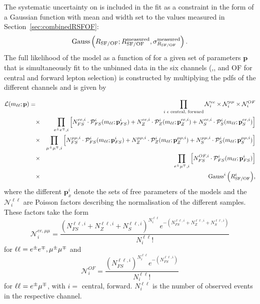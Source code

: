 The systematic uncertainty on \Rsfof is included in the fit as a constraint in the form of a Gaussian function with mean and width set to the values measured in Section~\ref{sec:combinedRSFOF}:
\begin{equation*}
\mathrm{Gauss}\left(R_{\text{SF/OF}};R_{\text{SF/OF}}^{\text{measured}},\sigma_{R_{\text{SF/OF}}}^{\text{measured}}\right).
\end{equation*}
The full likelihood of the model as a function of \mll for a given set of parameters $\mathbf{p}$ that is simultaneously fit to the unbinned data in the six channels (\EE,\MM, and OF for central and forward lepton selection) is constructed by multiplying the pdfs of the different channels and is given by

\begin{eqnarray*}
{\mathcal{L}}(m_{\ell\ell};\mathbf{p}) =&&   \prod\limits_{i\text{ } \epsilon \text{ central, forward}} \mathcal{N}_i^{ee} \times \mathcal{N}_i^{\mu\mu} \times \mathcal{N}_i^{OF}\\
                        &\times& \prod_{\EE,i}\left[N_{FS}^{ee,i} \cdot {\mathcal{P}}_{FS}^i(m_{\ell\ell};\mathbf{p}_{FS}^i) %
                                                  + N_{Z}^{ee,i} \cdot {\mathcal{P}}_{Z}^i(m_{\ell\ell};\mathbf{p}_{Z}^{ee,i}) %
                                                  + N_{S}^{ee,i} \cdot {\mathcal{P}}_{S}^i(m_{\ell\ell};\mathbf{p}_{S}^{ee,i})\right] \\
                        &\times& \prod_{\MM,i}\left[N_{FS}^{\mu\mu,i} \cdot {\mathcal{P}}_{FS}^i(m_{\ell\ell};\mathbf{p}_{FS}^i) %
                                                  + N_{Z}^{\mu\mu,i} \cdot {\mathcal{P}}_{Z}^i(m_{\ell\ell};\mathbf{p}_{Z}^{\mu\mu,i}) %
                                                  + N_{S}^{\mu\mu,i} \cdot {\mathcal{P}}_{S}^i(m_{\ell\ell};\mathbf{p}_{S}^{\mu\mu,i})\right] \\
                        &\times& \prod_{\EM,i}\left[N_{FS}^{OF,i} \cdot {\mathcal{P}}_{FS}^i(m_{\ell\ell};\mathbf{p}_{FS}^i)\right] \\   
                        &\times& {\mathrm{Gauss}^i\left(\Rsfof^i\right)}, \\
\end{eqnarray*}
where the different $\mathbf{p}^i_{x}$ denote the sets of free parameters of the models and the $\mathcal{N}_i^{\ell\ell}$ are Poisson factors describing the normalisation of the different samples. These factors take the form
\begin{equation*}
\mathcal{N}_i^{ee,\mu\mu} = \frac{(N_{FS}^{\ell\ell,i} + N_{Z}^{\ell\ell,i} + N_{S}^{\ell\ell,i})^{N_i^{\ell\ell}} e^{-(N_{FS}^{\ell\ell,i} + N_{Z}^{\ell\ell,i} + N_{S}^{\ell\ell,i})}}{N_i^{\ell\ell}!}
\end{equation*} 
for $\ell\ell = e^\pm e^\mp, \mu^\pm\mu^\mp$ and
\begin{equation*}
\mathcal{N}_i^{OF} = \frac{(N_{FS}^{\ell\ell,i})^{N_i^{\ell\ell}} e^{-(N_{FS}^{\ell\ell,i})}}{N_i^{\ell\ell}!}
\end{equation*}
for $\ell\ell = e^\pm\mu^\mp$, with $i =$ central, forward. $N_i^{\ell\ell}$ is the number of observed events in the respective channel. 

